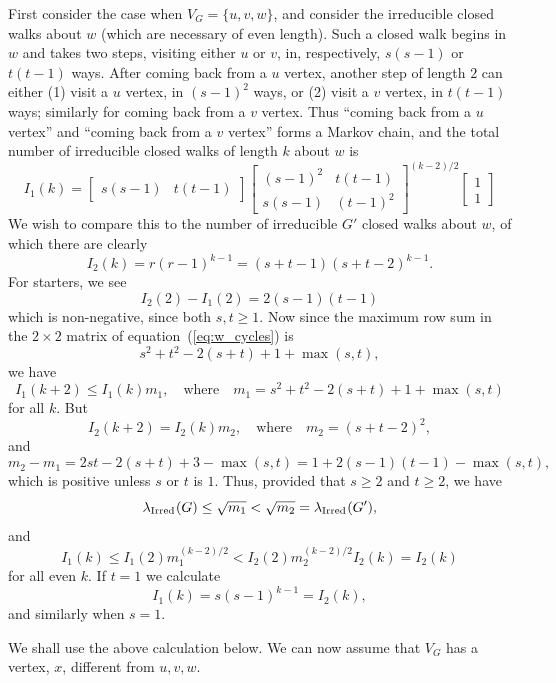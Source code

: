 \documentclass[12pt]{article}
\newcommand{\ird}[1]{{\rm Irred}_{#1}}
\begin{document}
First consider the case when $V_G=\{u,v,w\}$, and consider the irreducible
closed walks about $w$ (which are necessary of even length).  Such a closed walk begins
in $w$ and takes two steps, visiting either $u$ or $v$, in, respectively,
$s(s-1)$ or $t(t-1)$ ways.  After coming back from a $u$ vertex, another
step of length $2$ can either (1) visit a $u$ vertex, in $(s-1)^2$ ways,
or (2) visit a $v$ vertex, in $t(t-1)$ ways; similarly for coming back from
a $v$ vertex.  Thus ``coming back from a $u$ vertex'' and
``coming back from a $v$ vertex'' forms a Markov chain, and the total number
of irreducible closed walks of length $k$ about $w$ is
\begin{equation}\label{eq:w_cycles}
I_1(k)=
\left[ \begin{array}{cc}s(s-1)&t(t-1)\end{array}\right]
\left[ \begin{array}{cc}(s-1)^2&t(t-1)\\s(s-1)&(t-1)^2\end{array}\right]^{(k-2)/2}
\left[ \begin{array}{c}1\\1\end{array}\right]
\end{equation}
We wish to compare this to the number of irreducible $G'$ closed walks about $w$,
of which there are clearly
$$
I_2(k)=r(r-1)^{k-1} = (s+t-1)(s+t-2)^{k-1}.
$$
For starters, we see
$$
I_2(2)-I_1(2)=2(s-1)(t-1)
$$
which is non-negative, since both $s,t\ge 1$.  Now since the maximum row sum
in the $2\times 2$ matrix of equation~(\ref{eq:w_cycles}) is
$$
s^2+t^2-2(s+t)+1+\max(s,t),
$$
we have
$$
I_1(k+2)\le I_1(k)m_1,\quad\mbox{where}\quad
m_1=s^2+t^2-2(s+t)+1+\max(s,t)
$$
for all $k$.  But
$$
I_2(k+2) = I_2(k)m_2,\quad\mbox{where}\quad m_2=(s+t-2)^2,
$$
and
$$
m_2-m_1 = 2st-2(s+t)+3-\max(s,t) = 1+2(s-1)(t-1)-\max(s,t),
$$
which is positive unless $s$ or $t$ is $1$.
Thus, provided that $s\ge 2$ and $t\ge 2$, we have
$$
\lambda_{\ird{}}(G)\le \sqrt{m_1}<\sqrt{m_2}=\lambda_{\ird{}}(G'),
$$
and
\begin{equation}\label{eq:compare_I}
I_1(k)\le I_1(2)m_1^{(k-2)/2}< I_2(2)m_2^{(k-2)/2} I_2(k) = I_2(k)
\end{equation}
for all even $k$.  If $t=1$ we calculate
\begin{equation}\label{eq:compare_I_t1}
I_1(k)=s(s-1)^{k-1}=I_2(k),
\end{equation}
and similarly when $s=1$.


We shall use the above calculation below.  We can now assume that
$V_G$ has a vertex, $x$, different from $u,v,w$.
\end{document}
